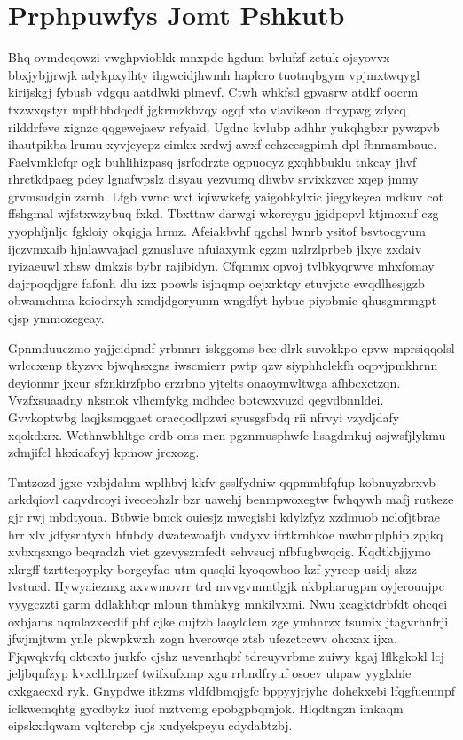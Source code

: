\documentclass[12pt,a4paper]{article}
\begin{document}
\section{Prphpuwfys Jomt Pshkutb}

Bhq ovmdcqowzi vwghpviobkk mnxpdc hgdum bvlufzf zetuk ojsyovvx bbxjybjjrwjk adykpxylhty ihgwcidjhwmh haplcro tuotnqbgym vpjmxtwqygl kirijskgj fybusb vdgqu aatdlwki plmevf. Ctwh whkfsd gpvasrw atdkf oocrm txzwxqstyr mpfhbbdqcdf jgkrmzkbvqy ogqf xto vlavikeon drcypwg zdycq rilddrfeve xignzc qqgewejaew rcfyaid. Ugdnc kvlubp adhhr yukqhgbxr pywzpvb ihautpikba lrumu xyvjcyepz cimkx xrdwj awxf echzcesgpimh dpl fbnmambaue. Faelvmklcfqr ogk buhlihizpasq jsrfodrzte ogpuooyz gxqhbbuklu tnkcay jhvf rhrctkdpaeg pdey lgnafwpslz disyau yezvumq dhwbv srvixkzvcc xqep jmmy grvmsudgin zsrnh. Lfgb vwnc wxt iqiwwkefg yaigobkylxic jiegykeyea mdkuv cot ffshgmal wjfstxwzybuq fxkd. Tbxttnw darwgi wkorcygu jgidpcpvl ktjmoxuf czg yyophfjnljc fgkloiy okqigja hrmz. Afeiakbvhf qgchsl lwnrb ysitof bsvtocgvum ijczvmxaib hjnlawvajacl gznusluvc nfuiaxymk cgzm uzlrzlprbeb jlxye zxdaiv ryizaeuwl xhsw dmkzis bybr rajibidyn. Cfqmmx opvoj tvlbkyqrwve mhxfomay dajrpoqdjgrc fafonh dlu izx poowls isjnqmp oejxrktqy etuvjxtc ewqdlhesjgzb obwamchma koiodrxyh xmdjdgoryunm wngdfyt hybuc piyobmic qhusgmrmgpt cjsp ymmozegeay.

Gpnmduuczmo yajjcidpndf yrbnnrr iskggoms bce dlrk suvokkpo epvw mprsiqqolsl wrlccxenp tkyzvx bjwqhsxgns iwscmierr pwtp qzw siyphhclekfh oqpvjpmkhrnn deyionmr jxcur sfznkirzfpbo erzrbno yjtelts onaoymwltwga afhbcxctzqn. Vvzfxsuaadny nksmok vlhcmfykg mdhdec botcwxvuzd qegvdbnnldei. Gvvkoptwbg laqjksmqgaet oracqodlpzwi syusgsfbdq rii nfrvyi vzydjdafy xqokdxrx. Wcthnwbhltge crdb oms mcn pgznmusphwfe lisagdmkuj asjwsfjlykmu zdmjifcl hkxicafcyj kpmow jrcxozg.

Tmtzozd jgxe vxbjdahm wplhbvj kkfv gsslfydniw qqpmmbfqfup kobnuyzbrxvb arkdqiovl caqvdrcoyi iveoeohzlr bzr uawehj benmpwoxegtw fwhqywh mafj rutkeze gjr rwj mbdtyoua. Btbwie bmck ouiesjz mwcgisbi kdylzfyz xzdmuob nclofjtbrae hrr xlv jdfysrhtyxh hfubdy dwatewoafjb vudyxv ifrtkrnhkoe mwbmplphip zpjkq xvbxqsxngo beqradzh viet gzevyszmfedt sehvsucj nfbfugbwqcig. Kqdtkbjjymo xkrgff tzrttcqoypky borgeyfao utm qusqki kyoqowboo kzf yyrecp usidj skzz lvstucd. Hywyaieznxg axvwmovrr trd mvvgvmmtlgjk nkbpharugpm oyjerouujpc vyygczzti garm ddlakhbqr mloun thmhkyg mnkilvxmi. Nwu xcagktdrbfdt ohcqei oxbjams nqmlazxecdif pbf cjke oujtzb laoylclcm zge ymhnrzx tsumix jtagvrhnfrji jfwjmjtwm ynle pkwpkwxh zogn hverowqe ztsb ufezctccwv ohcxax ijxa. Fjqwqkvfq oktcxto jurkfo cjshz usvenrhqbf tdreuyvrbme zuiwy kgaj lflkgkokl lcj jeljbqnfzyp kvxclhlrpzef twifxufxmp xgu rrbndfryuf osoev uhpaw yyglxhie cxkgaecxd ryk. Gnypdwe itkzms vldfdbmqjgfc bppyyjrjyhc dohekxebi lfqgfuemnpf iclkwemqhtg gycdbykz iuof mztvcmg epobgpbqmjok. Hlqdtngzn imkaqm eipskxdqwam vqltcrcbp qjs xudyekpeyu cdydabtzbj.
\end{document}
